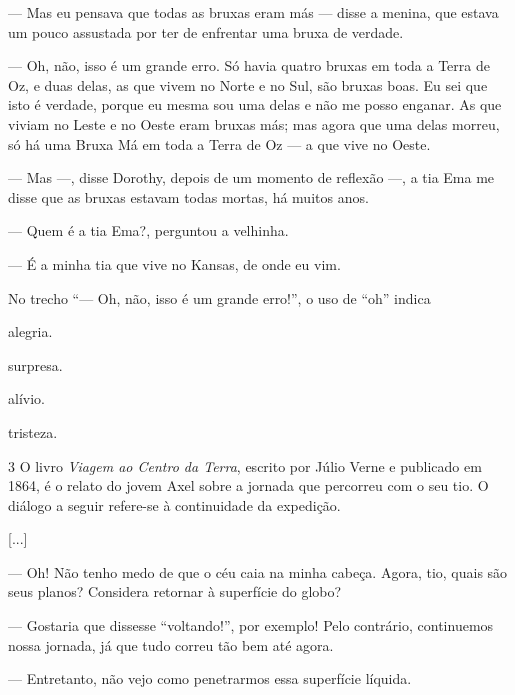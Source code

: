 \begin{conteudo}
\begin{conteudo}
\begin{conteudo}
\begin{conteudo}
\begin{conteudo}
\begin{myquote}
--- Mas eu pensava que todas as bruxas eram más --- disse a menina, que estava um pouco
assustada por ter de enfrentar uma bruxa de verdade. 

--- Oh, não, isso é um grande erro. Só havia quatro bruxas em toda a Terra de Oz, 
e duas delas, as que vivem no Norte e no Sul, são bruxas boas. 
Eu sei que isto é verdade, porque eu mesma sou uma delas e não me posso enganar. 
As que viviam no Leste e no Oeste eram bruxas más; mas agora que uma delas morreu, 
só há uma Bruxa Má em toda a Terra de Oz --- a que vive no Oeste.

--- Mas ---, disse Dorothy, depois de um momento de reflexão ---, a tia Ema me disse
que as bruxas estavam todas mortas, há muitos anos.

--- Quem é a tia Ema?, perguntou a velhinha.

--- É a minha tia que vive no Kansas, de onde eu vim.

\end{myquote}

No trecho ``--- Oh, não, isso é um grande erro!'', o uso de ``oh'' indica

\begin{escolha}
\item alegria.

\item surpresa.

\item alívio.

\item tristeza.
\end{escolha}

\num{3} O livro \textit{Viagem ao Centro da Terra}, escrito por Júlio Verne e
publicado em 1864, é o relato do jovem Axel sobre a jornada que
percorreu com o seu tio. O diálogo a seguir refere-se à continuidade da expedição.

\begin{myquote}
{[}...{]}

--- Oh! Não tenho medo de que o céu caia na minha cabeça.
Agora, tio, quais são seus planos? Considera retornar à superfície do globo?

--- Gostaria que dissesse ``voltando!'', por exemplo! 
Pelo contrário, continuemos nossa jornada, já que tudo correu tão bem até agora.

--- Entretanto, não vejo como penetrarmos essa superfície líquida.


\end{myquote}
\end{conteudo}
\end{conteudo}
\end{conteudo}
\end{conteudo}
\end{conteudo}
